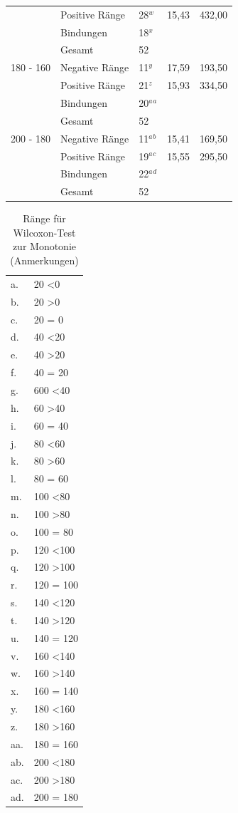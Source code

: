 \documentclass[a4paper]{thesis}
\begin{document}
\begin{table}[H]
\begin{tabular}{l|l|l|l|l}
& Positive Ränge & 28$^w$ & 15,43 & 432,00 \\
& Bindungen & 18$^x$ &  &  \\
& Gesamt & 52 &  &  \\
\hline
180 - 160 & Negative Ränge & 11$^y$ & 17,59 & 193,50 \\
& Positive Ränge & 21$^z$ & 15,93 & 334,50 \\
& Bindungen & 20$^a$$^a$ &  &  \\
& Gesamt & 52 &  &  \\
\hline
200 - 180 & Negative Ränge & 11$^a$$^b$ & 15,41 & 169,50 \\
& Positive Ränge & 19$^a$$^c$ & 15,55 & 295,50 \\
& Bindungen & 22$^a$$^d$ &  &  \\
& Gesamt & 52 &  &  \\
\end{tabular}
\end{table}

\begin{table}[H]
\centering
\caption{Ränge für Wilcoxon-Test zur Monotonie (Anmerkungen)}
\label{Ränge für Wilcoxon-Test zur Monotonie (Anmerkungen)}
\begin{tabular}{ll}
a. & 20 \textless 0\\
b. & 20 \textgreater 0\\
c. & 20 = 0\\
d. & 40 \textless 20\\
e. & 40 \textgreater 20\\
f. & 40 = 20\\
g. & 600 \textless 40\\
h. & 60 \textgreater 40\\
i. & 60 = 40\\
j. & 80 \textless 60\\
k. & 80 \textgreater 60\\
l. & 80 = 60\\
m. & 100 \textless 80\\
n. & 100 \textgreater 80\\
o. & 100 = 80\\
p. & 120 \textless 100\\
q. & 120 \textgreater 100\\
r. & 120 = 100\\
s. & 140 \textless 120\\
t. & 140 \textgreater 120\\
u. & 140 = 120\\
v. & 160 \textless 140\\
w. & 160 \textgreater 140\\
x. & 160 = 140\\
y. & 180 \textless 160\\
z. & 180 \textgreater 160\\
aa. & 180 = 160\\
ab. & 200 \textless 180\\
ac. & 200 \textgreater 180\\
ad. & 200 = 180
\end{tabular}
\end{table}
\end{document}
